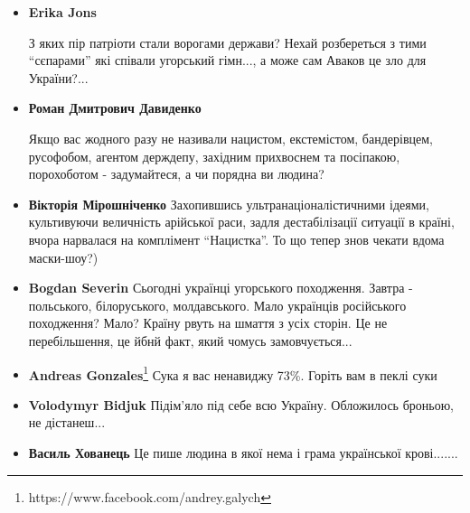 \begin{itemize}
\item \textbf{Erika Jons}

З яких пір патріоти стали ворогами держави? Нехай розбереться з тими \enquote{сєпарами}
які співали угорський гімн..., а може сам Аваков це зло для України?...

\item \textbf{Роман Дмитрович Давиденко}

Якщо вас жодного разу не називали нацистом, екстемістом, бандерівцем,
русофобом, агентом держдепу, західним прихвоснем та посіпакою, порохоботом
- задумайтеся, а чи порядна ви людина?

\item \textbf{Вікторія Мірошніченко}
Захопившись ультранаціоналістичними ідеями, культивуючи величність арійської раси, задля дестабілізації ситуації в країні, вчора нарвалася на комплімент \enquote{Нацистка}. То що тепер знов чекати вдома маски-шоу?)

\item \textbf{Bogdan Severin}
Сьогодні українці угорського походження.
Завтра - польського, білоруського, молдавського. Мало українців російського походження? Мало?
Країну рвуть на шмаття з усіх сторін. Це не перебільшення, це йбнй факт, який чомусь замовчується...

\item \textbf{Andreas Gonzales}\footnote{https://www.facebook.com/andrey.galych}
Сука я вас ненавиджу 73\%. Горіть вам в пеклі суки

\item \textbf{Volodymyr Bidjuk}
Підім'яло під себе всю Україну. Обложилось броньою, не дістанеш...

\item \textbf{Василь Хованець}
Це пише людина в якої нема і грама української крові.......

\end{itemize}
